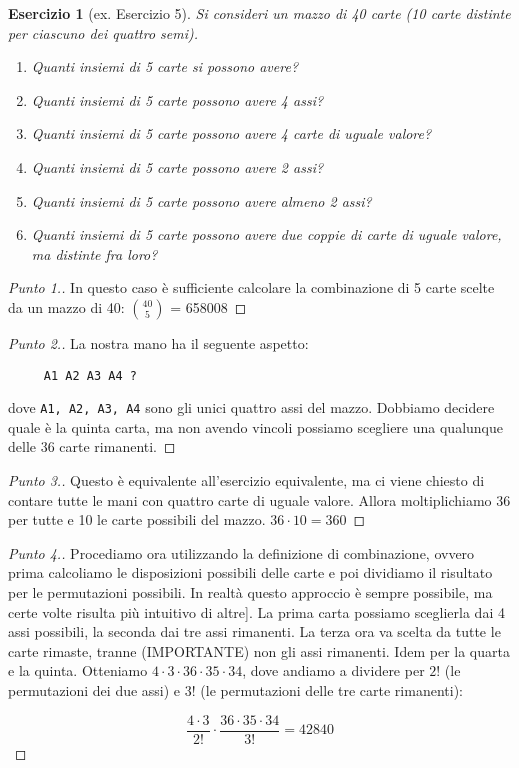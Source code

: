 \documentclass[12pt]{article}
\newtheorem{theorem}{Esercizio}
\renewcommand\qedsymbol{$\blacksquare$}
\begin{document}
\renewcommand\qedsymbol{$\square$}

\begin{theorem}[ex. Esercizio 5]
Si consideri un mazzo di 40 carte (10 carte distinte per ciascuno dei quattro semi).

\begin{enumerate}
    \item Quanti insiemi di 5 carte si possono avere?
    \item Quanti insiemi di 5 carte possono avere 4 assi?
    \item Quanti insiemi di 5 carte possono avere 4 carte di uguale valore?
    \item Quanti insiemi di 5 carte possono avere 2 assi?
    \item Quanti insiemi di 5 carte possono avere almeno 2 assi?
    \item Quanti insiemi di 5 carte possono avere due coppie di carte di uguale valore, ma distinte fra loro?
\end{enumerate}
\end{theorem}

\begin{proof}[Punto 1.]
In questo caso è sufficiente calcolare la combinazione di 5 carte scelte da un mazzo di 40: ${40 \choose 5}$ = 658008
\end{proof}

\begin{proof}[Punto 2.]
La nostra mano ha il seguente aspetto:

\begin{verbatim}
     A1 A2 A3 A4 ?
\end{verbatim}

dove \verb=A1, A2, A3, A4= sono gli unici quattro assi del mazzo. Dobbiamo decidere quale è la quinta carta, ma non avendo vincoli possiamo scegliere una qualunque delle 36 carte rimanenti. 
\end{proof}

\begin{proof}[Punto 3.]
Questo è equivalente all'esercizio equivalente, ma ci viene chiesto di contare tutte le mani con quattro carte di uguale valore. Allora moltiplichiamo 36 per tutte e 10 le carte possibili del mazzo. $36 \cdot 10 = 360$
\end{proof}

\begin{proof}[Punto 4.]
Procediamo ora utilizzando la definizione di combinazione, ovvero prima calcoliamo le disposizioni possibili delle carte e poi dividiamo il risultato per le permutazioni possibili. In realtà questo approccio è sempre possibile, ma certe volte risulta più intuitivo di altre]. La prima carta possiamo sceglierla dai 4 assi possibili, la seconda dai tre assi rimanenti. La terza ora va scelta da tutte le carte rimaste, tranne (IMPORTANTE) non gli assi rimanenti. Idem per la quarta e la quinta. 
Otteniamo $4 \cdot 3 \cdot 36 \cdot 35 \cdot 34$, dove andiamo a dividere per $2!$ (le permutazioni dei due assi) e $3!$ (le permutazioni delle tre carte rimanenti):

$$
\frac{4\cdot3}{2!}\cdot\frac{36\cdot35\cdot34}{3!} = 42840
$$
\end{proof}
\end{document}
